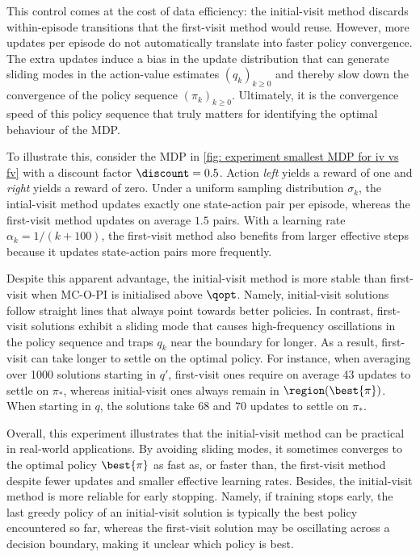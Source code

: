 This control comes at the cost of data efficiency: the initial-visit method discards within-episode transitions that the first-visit method would reuse. However, more updates per episode do not automatically translate into faster policy convergence.
The extra updates induce a bias in the update distribution that can generate sliding modes in the action-value estimates $(q_k)_{k \ge 0}$ and thereby slow down the convergence of the policy sequence $(\pi_k)_{k \ge 0}$. Ultimately, it is the convergence speed of this policy sequence that truly matters for identifying the optimal behaviour of the MDP.

To illustrate this, consider the MDP in \autoref{fig: experiment smallest MDP for iv vs fv} with a discount factor $\discount = 0.5$. Action \textit{left} yields a reward of one and \textit{right} yields a reward of zero.
Under a uniform sampling distribution $\sigma_k$, the intial-visit method updates exactly one state-action pair per episode, whereas the first-visit method updates on average $1.5$ pairs.
With a learning rate $\alpha_k = 1/(k+100)$, the first-visit method also benefits from larger effective steps because it updates state-action pairs more frequently.


Despite this apparent advantage, the initial-visit method is more stable than first-visit when MC-O-PI is initialised above $\qopt$.
Namely, initial-visit solutions follow straight lines that always point towards better policies.
In contrast, first-visit solutions exhibit a sliding mode that causes high-frequency oscillations in the policy sequence and traps $q_k$ near the boundary for longer.
As a result, first-visit can take longer to settle on the optimal policy.
For instance, when averaging over 1000 solutions starting in $q'$, first-visit ones require on average 43 updates to settle on $\pi_*$, whereas initial-visit ones always remain in $\region(\best{\pi})$.
When starting in $q$, the solutions take 68 and 70 updates to settle on $\pi_*$.


Overall, this experiment illustrates that the initial-visit method can be practical in real-world applications. 
By avoiding sliding modes, it sometimes converges to the optimal policy $\best{\pi}$ as fast as, or faster than, the first-visit method despite fewer updates and smaller effective learning rates.
Besides, the initial-visit method is more reliable for early stopping. Namely, if training stops early, the last greedy policy of an initial-visit solution is typically the best policy encountered so far, whereas the first-visit solution may be oscillating across a decision boundary, making it unclear which policy is best.


